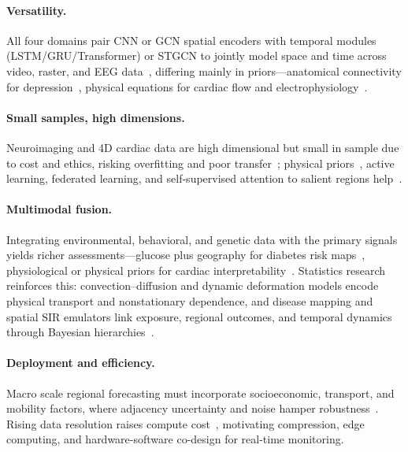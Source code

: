 \documentclass[journal]{IEEEtran}
\begin{document}
\paragraph{Versatility.} All four domains pair CNN or GCN spatial encoders with temporal modules (LSTM/GRU/Transformer) or STGCN to jointly model space and time across video, raster, and EEG data~\cite{2,3,4,6}, differing mainly in priors---anatomical connectivity for depression~\cite{4}, physical equations for cardiac flow and electrophysiology~\cite{5,7}.

\paragraph{Small samples, high dimensions.} Neuroimaging and 4D cardiac data are high dimensional but small in sample due to cost and ethics, risking overfitting and poor transfer~\cite{4,5,6}; physical priors~\cite{7}, active learning, federated learning, and self-supervised attention to salient regions help~\cite{2,4}.

\paragraph{Multimodal fusion.} Integrating environmental, behavioral, and genetic data with the primary signals yields richer assessments---glucose plus geography for diabetes risk maps~\cite{XiaoLi2016DiabetesSpatiotemporal}, physiological or physical priors for cardiac interpretability~\cite{5,7}. Statistics research reinforces this: convection--diffusion and dynamic deformation models encode physical transport and nonstationary dependence, and disease mapping and spatial SIR emulators link exposure, regional outcomes, and temporal dynamics through Bayesian hierarchies~\cite{liu2022convectionDiffusion,castroMorales2025dynamicDeformation,wang2024respiratoryDiseaseMapping,trostle2024spatialSIR,wikle2023statisticalDeepLearning}.

\paragraph{Deployment and efficiency.} Macro scale regional forecasting must incorporate socioeconomic, transport, and mobility factors, where adjacency uncertainty and noise hamper robustness~\cite{2,3}. Rising data resolution raises compute cost~\cite{5,7}, motivating compression, edge computing, and hardware-software co-design for real-time monitoring.
\end{document}
